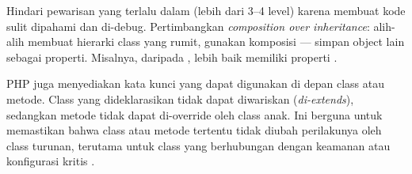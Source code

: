 \begin{catatan}
Hindari pewarisan yang terlalu dalam (lebih dari 3--4 level) karena membuat kode sulit dipahami dan di-debug. Pertimbangkan \textit{composition over inheritance}: alih-alih membuat hierarki class yang rumit, gunakan komposisi --- simpan object lain sebagai properti. Misalnya, daripada , lebih baik  memiliki properti .
\end{catatan}

PHP juga menyediakan kata kunci  yang dapat digunakan di depan class atau metode. Class yang dideklarasikan  tidak dapat diwariskan (\textit{di-extends}), sedangkan metode  tidak dapat di-override oleh class anak. Ini berguna untuk memastikan bahwa class atau metode tertentu tidak diubah perilakunya oleh class turunan, terutama untuk class yang berhubungan dengan keamanan atau konfigurasi kritis \cite{phpManual}.

